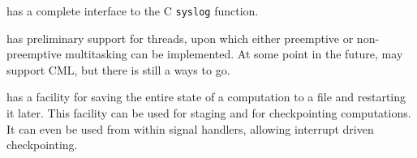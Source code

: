 \begin{description}
\begin{description}
{\mlton} has a complete interface to the C {\tt syslog} function.

{\mlton} has preliminary support for threads, upon which either
preemptive or non-preemptive multitasking can be implemented.  At some
point in the future, {\mlton} may support CML, but there is still a
ways to go.

{\mlton} has a facility for saving the entire state of a computation
to a file and restarting it later.  This facility can be used for
staging and for checkpointing computations.  It can even be used from
within signal handlers, allowing interrupt driven checkpointing.

\end{description}
\end{description}

